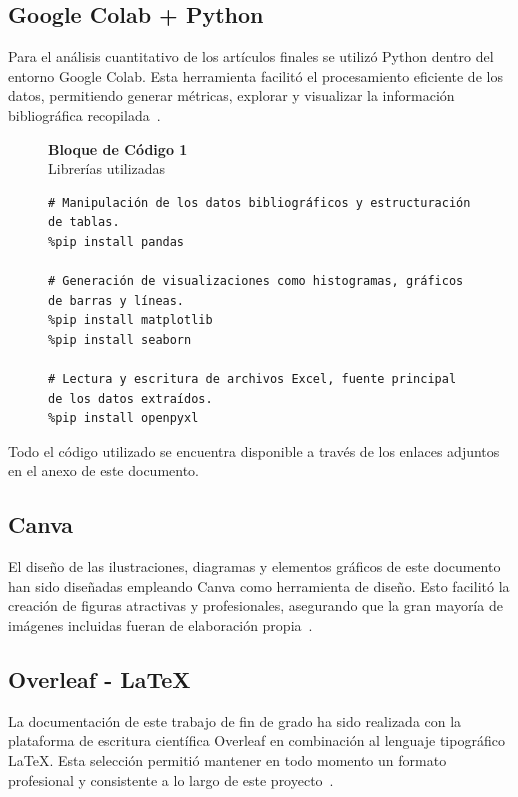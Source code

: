 \subsection{Google Colab + Python}
Para el análisis cuantitativo de los artículos finales se utilizó Python dentro del entorno Google Colab. Esta herramienta facilitó el procesamiento eficiente de los datos, permitiendo generar métricas, explorar y visualizar la información bibliográfica recopilada~\cite{GoogleColabSite}.

\begin{figure}[H]
\centering
\begin{minipage}{0.8\textwidth}
    \centering
    {\fontsize{12}{11}\selectfont
     \textbf{Bloque de Código 1} \\
     Librerías utilizadas \\
    }
    \begin{verbatim}
# Manipulación de los datos bibliográficos y estructuración de tablas.
%pip install pandas

# Generación de visualizaciones como histogramas, gráficos de barras y líneas.
%pip install matplotlib
%pip install seaborn

# Lectura y escritura de archivos Excel, fuente principal de los datos extraídos.
%pip install openpyxl
    \end{verbatim}
\end{minipage}
\end{figure}

Todo el código utilizado se encuentra disponible a través de los enlaces adjuntos en el anexo de este documento.

\subsection{Canva}
El diseño de las ilustraciones, diagramas y elementos gráficos de este documento han sido diseñadas empleando Canva como herramienta de diseño. Esto facilitó la creación de figuras atractivas y profesionales, asegurando que la gran mayoría de imágenes incluidas fueran de elaboración propia~\cite{CanvaSite}.

\subsection{Overleaf - LaTeX}
La documentación de este trabajo de fin de grado ha sido realizada con la plataforma de escritura científica Overleaf en combinación al lenguaje tipográfico LaTeX. Esta selección permitió mantener en todo momento un formato profesional y consistente a lo largo de este proyecto~\cite{OverleafSite}.

